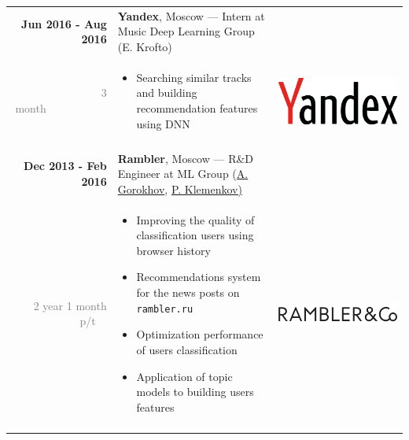 \documentclass[a4paper,10pt]{article} %
\begin{document}
\begin{tabular}{r|p{11.5cm}c}
\textbf{Jun 2016 - Aug 2016}
 & \textbf{Yandex}, Moscow --- Intern at Music Deep Learning Group \footnotesize{(E. Krofto)} \\ 
\textcolor{gray}{3 month}~~~~~~~~~~~&  \footnotesize{
  
  \vspace{-0.25cm}
  \begin{itemize}
      \item Searching similar tracks and building recommendation features using DNN
  \end{itemize}
  \vspace{-0.3cm}
} 
& \multirow{2}{*}{\includegraphics[scale=0.02]{img/yandex}}\\
\multicolumn{2}{c}{}\\

\textbf{Dec 2013 - Feb 2016}
 & \textbf{Rambler}, Moscow --- R\&D Engineer at ML Group \footnotesize{(\href{https://ru.linkedin.com/in/anton-gorokhov-2959482}{A. Gorokhov}, \href{https://ru.linkedin.com/in/pavel-klemenkov-7a88a956}{P. Klemenkov)}}\\ 
\textcolor{gray}{2 year 1 month p/t}~~ &  \footnotesize{
  
  \vspace{-0.25cm}
  \begin{itemize}
      \item Improving the quality of classification users using browser history
  	  \item Recommendations system for the news posts on \texttt{rambler.ru}
      \item Optimization performance of users classification
      \item Application of topic models to building users features 
  \end{itemize}
  \vspace{-0.3cm}
} 
& \multirow{2}{*}{\includegraphics[scale=0.12]{img/ramblerco}}\\
\multicolumn{2}{c}{}\\


\end{tabular}
\end{document}
